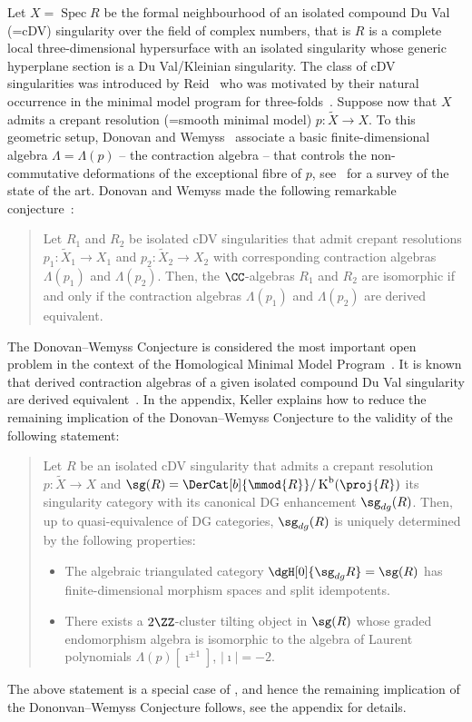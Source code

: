 \documentclass[a4paper]{amsart}
\begin{document}
Let $X=\operatorname{Spec}R$ be the formal neighbourhood of an isolated compound
Du Val (=cDV) singularity over the field of complex numbers, that is $R$ is a
complete local three-dimensional hypersurface with an isolated singularity whose
generic hyperplane section is a Du Val/Kleinian singularity. The class of cDV
singularities was introduced by Reid~\cite{Reid81} who was motivated by their
natural occurrence in the minimal model program for three-folds~\cite{KM98}.
Suppose now that $X$ admits a crepant resolution (=smooth minimal model)
$p\colon\tilde{X}\to X$. To this geometric setup, Donovan and Wemyss~\cite{DW16}
associate a basic finite-dimensional algebra $\Lambda=\Lambda(p)$ -- the
contraction algebra -- that controls
the non-commutative deformations of the exceptional fibre of $p$,
see~\cite{Wem23} for a survey of the state of the art. Donovan and Wemyss made
the following remarkable conjecture~\cite{DW16,Aug20a}:
\begin{quote}
  Let $R_1$ and $R_2$ be isolated cDV singularities that admit crepant
  resolutions $p_1\colon\tilde{X}_1\to X_1$ and $p_2\colon\tilde{X}_2\to X_2$
  with corresponding contraction algebras $\Lambda(p_1)$ and $\Lambda(p_2)$.
  Then, the $\CC$-algebras $R_1$ and $R_2$ are isomorphic if and only if the
  contraction algebras $\Lambda(p_1)$ and $\Lambda(p_2)$ are derived equivalent.
\end{quote}
The Donovan--Wemyss Conjecture is considered the most important open problem in
the context of the Homological Minimal Model Program~\cite{Wem18}. It is known
that derived contraction algebras of a given isolated compound Du Val
singularity are derived equivalent~\cite{Wem18,Dug10}. In the appendix, Keller
explains how to reduce the remaining implication of the Donovan--Wemyss
Conjecture to the validity of the following statement:
\begin{quote}
  Let $R$ be an isolated cDV singularity that admits a crepant resolution
  $p\colon\tilde{X}\to X$ and
  $\sg(R)=\DerCat[b]{\mmod{R}}/\operatorname{K}^{\mathrm{b}}(\proj{R})$ its
  singularity category with its canonical DG enhancement $\sg_{dg}(R)$. Then, up
  to quasi-equivalence of DG categories, $\sg_{dg}(R)$ is uniquely determined by
  the following properties:
  \begin{itemize}
  \item The algebraic triangulated category $\dgH[0]{\sg_{dg}{R}}=\sg(R)$ has
    finite-dimensional morphism spaces and split idempotents.
  \item There exists a $2\ZZ$-cluster tilting object in $\sg(R)$ whose graded
    endomorphism algebra is isomorphic to the algebra of Laurent polynomials
    $\Lambda(p)[\imath^{\pm1}]$, $|\imath|=-2$.
  \end{itemize}
\end{quote}
The above statement is a special case of ,
and hence the remaining implication of the Dononvan--Wemyss Conjecture follows,
see the appendix for details.
\end{document}
